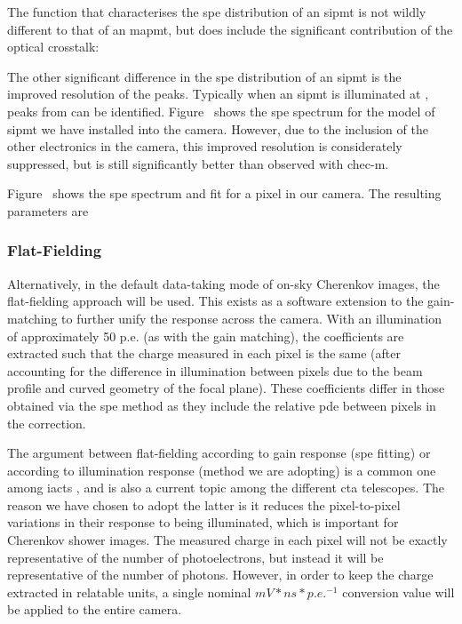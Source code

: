 The function that characterises the \gls{spe} distribution of an \gls{sipmt} is not wildly different to that of an \gls{mapmt}, but does include the significant contribution of the optical crosstalk:

The other significant difference in the \gls{spe} distribution of an \gls{sipmt} is the improved resolution of the peaks. Typically when an \gls{sipmt} is illuminated at , peaks from  can be identified. Figure~ shows the \gls{spe} spectrum for the model of \gls{sipmt} we have installed into the camera. However, due to the inclusion of the other electronics in the camera, this improved resolution is considerately suppressed, but is still significantly better than observed with \gls{chec-m}.

Figure~ shows the \gls{spe} spectrum and fit for a pixel in our camera. The resulting parameters are 

\subsubsection{Flat-Fielding}

Alternatively, in the default data-taking mode of on-sky Cherenkov images, the flat-fielding approach will be used. This exists as a software extension to the gain-matching to further unify the response across the camera. With an illumination of approximately 50 p.e. (as with the gain matching), the coefficients are extracted such that the charge measured in each pixel is the same (after accounting for the difference in illumination between pixels due to the beam profile and curved geometry of the focal plane). These coefficients differ in those obtained via the \gls{spe} method as they include the relative \gls{pde} between pixels in the correction. 

The argument between flat-fielding according to gain response (\gls{spe} fitting) or according to illumination response (method we are adopting) is a common one among \glspl{iact} , and is also a current topic among the different \gls{cta} telescopes. The reason we have chosen to adopt the latter is it reduces the pixel-to-pixel variations in their response to being illuminated, which is important for Cherenkov shower images. The measured charge in each pixel will not be exactly representative of the number of photoelectrons, but instead it will be representative of the number of photons. However, in order to keep the charge extracted in relatable units, a single nominal $mV*ns*p.e.^{-1}$ conversion value will be applied to the entire camera.

